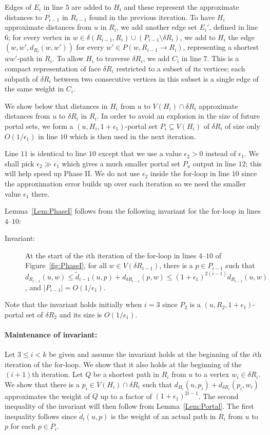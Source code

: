 \documentclass[11pt]{article}
\begin{document}
Edges of $E_i$ in line $5$ are added to $H_i$ and these represent the approximate distances to $P_{i-1}$ in $R_{i-1}$ found in the previous iteration. To have $H_i$ approximate distances from $u$ in $R_i$, we add another edge set $E_i'$, defined in line $6$; for every vertex in $w\in \delta(R_{i-1},R_i)\cup(P_{i-1}\setminus\delta R_i)$, we add to $H_i$ the edge $(w,w',d_{R_i}(w,w'))$ for every $w'\in P(w,R_{i-1}\rightarrow R_i)$, representing a shortest $ww'$-path in $R_i$. To allow $H_i$ to traverse $\delta R_i$, we add $C_i$ in line $7$. This is a compact representation of face $\delta R_i$ restricted to a subset of its vertices; each subpath of $\delta R_i$ between two consecutive vertices in this subset is a single edge of the same weight in $C_i$.

We show below that distances in $H_i$ from $u$ to $V(H_i)\cap\delta R_i$ approximate distances from $u$ to $\delta R_i$ in $R_i$. In order to avoid an explosion in the size of future portal sets, we form a $(u,H_i,1+\epsilon_1)$-portal set $P_i\subseteq V(H_i)$ of $\delta R_i$ of size only $O(1/\epsilon_1)$ in line $10$ which is then used in the next iteration.

Line $11$ is identical to line $10$ except that we use a value $\epsilon_2 > 0$ instead of $\epsilon_1$. We shall pick $\epsilon_2 \gg \epsilon_1$ which gives a much smaller portal set $P_u$ output in line $12$; this will help speed up Phase II. We do not use $\epsilon_2$ inside the for-loop in line $10$ since the approximation error builds up over each iteration so we need the smaller value $\epsilon_1$ there.

Lemma~\ref{Lem:PhaseI} follows from the following invariant for the for-loop in lines $4$--$10$:
\begin{description}
\item[Invariant:] At the start of the $i$th iteration of the for-loop in lines $4$--$10$ of Figure~\ref{fig:PhaseI}, for all $w\in V(\delta R_{i-1})$, there is a $p\in P_{i-1}$ such that $d_{R_{i-1}}(u,w)\leq \tilde{d}_{i-1}(u,p) + d_{\delta R_{i-1}}(p,w)\leq (1+\epsilon_1)^{2(i-1)}d_{R_{i-1}}(u,w)$, and $|P_{i-1}| = O(1/\epsilon_1)$.
\end{description}

Note that the invariant holds initially when $i = 3$ since $P_2$ is a $(u,R_2,1+\epsilon_1)$-portal set of $\delta R_2$ and its size is $O(1/\epsilon_1)$.

\paragraph{Maintenance of invariant:} Let $3\leq i < k$ be given and assume the invariant holds at the beginning of the $i$th iteration of the for-loop. We show that it also holds at the beginning of the $(i+1)$th iteration. Let $Q$ be a shortest path in $R_i$ from $u$ to a vertex $w_i\in\delta R_i$. We show that there is a $p_i\in V(H_i)\cap\delta R_i$ such that $d_{H_i}(u,p_i) + d_{\delta R_i}(p_i,w_i)$ approximates the weight of $Q$ up to a factor of $(1+\epsilon_1)^{2i-1}$. The second inequality of the invariant will then follow from Lemma~\ref{Lem:Portal}. The first inequality follows since $\tilde d_i(u,p)$ is the weight of an actual path in $R_i$ from $u$ to $p$ for each $p\in P_i$.
\end{document}
